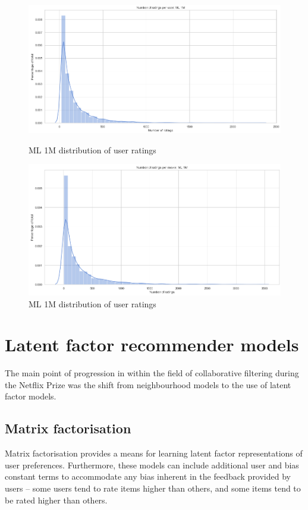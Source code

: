\begin{figure}[H]
\centering
\begin{minipage}[b]{0.7\textwidth}
   \includegraphics[width=1\linewidth]{Figures/ML1M-user-ratings.png}
   \caption{ML 1M distribution of user ratings}
   \label{fig:ML1m-users} 
\end{minipage}
\begin{minipage}[b]{0.7\textwidth}
   \includegraphics[width=1\linewidth]{Figures/ML1M-movie-ratings.png}
   \caption{ML 1M distribution of user ratings}
   \label{fig:ML1m-movies}
\end{minipage}
\end{figure}

\section{Latent factor recommender models}
The main point of progression in within the field of collaborative filtering during the Netflix Prize was the shift from neighbourhood models to the use of latent factor models.

\subsection{Matrix factorisation}
Matrix factorisation provides a means for learning latent factor representations of user preferences. Furthermore, these models can include additional user and bias constant terms to accommodate any bias inherent in the feedback provided by users -- some users tend to rate items higher than others, and some items tend to be rated higher than others.

